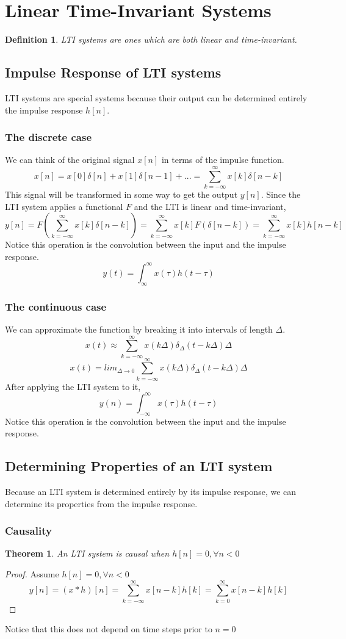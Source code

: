 \documentclass{article}
\newtheorem{theorem}{Theorem}
\newtheorem{definition}{Definition}
\newtheorem{proof}{Proof}
\begin{document}
\section{Linear Time-Invariant Systems}
\begin{definition}
    LTI systems are ones which are both linear and time-invariant.
\end{definition}
\subsection{Impulse Response of LTI systems}
LTI systems are special systems because their output can be determined entirely the impulse response $h[n]$.
\subsubsection{The discrete case}
We can think of the original signal $x[n]$ in terms of the impulse function.
$$x[n] = x[0]\delta[n]+x[1]\delta[n-1]+... = \sum_{k=-\infty}^{\infty}{x[k]\delta[n-k]}$$
This signal will be transformed in some way to get the output $y[n]$.
Since the LTI system applies a functional $F$ and the LTI is linear and time-invariant,
$$y[n] = F(\sum_{k=-\infty}^{\infty}{x[k]\delta[n-k]}) = \sum_{k=-\infty}^{\infty}{x[k]F(\delta[n-k])} = \sum_{k=-\infty}^{\infty}{x[k]h[n-k]}$$
Notice this operation is the convolution between the input and the impulse response.
$$y(t) = \int_{\infty}^{\infty}{x(\tau)h(t-\tau)}$$
\subsubsection{The continuous case}
We can approximate the function by breaking it into intervals of length $\Delta$.
$$x(t) \approx \sum_{k=-\infty}^{\infty}{x(k\Delta)\delta_{\Delta}(t-k\Delta)\Delta}$$
$$x(t) = lim_{\Delta \rightarrow 0}\sum_{k=-\infty}^{\infty}{x(k\Delta)\delta_{\Delta}(t-k\Delta)\Delta}$$
After applying the LTI system to it,
$$y(n) = \int_{-\infty}^{\infty}{x(\tau)h(t-\tau)}$$
Notice this operation is the convolution between the input and the impulse response.
\subsection{Determining Properties of an LTI system}
Because an LTI system is determined entirely by its impulse response, we can determine its properties from the impulse response.
\subsubsection{Causality}
\begin{theorem}
    An LTI system is causal when $h[n] = 0, \forall n < 0$
\end{theorem}
\begin{proof}
Assume $h[n] = 0, \forall n < 0$
$$y[n] = (x*h)[n] = \sum_{k=-\infty}^{\infty}{x[n-k]h[k]}=\sum_{k=0}^{\infty}{x[n-k]h[k]}$$
\end{proof}
Notice that this does not depend on time steps prior to $n=0$
\end{document}
